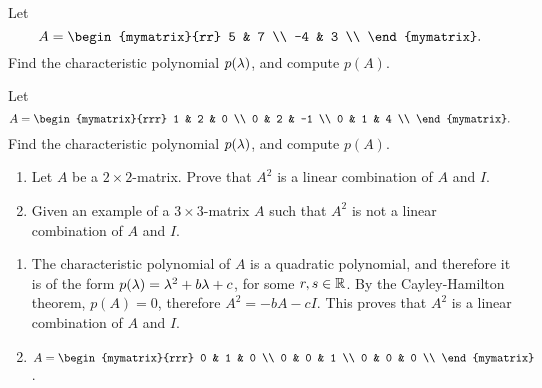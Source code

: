 \begin{enumialphparenastyle}
\begin{ex}
  Let
  \begin{equation*}
    A = \begin{mymatrix}{rr}
      5 & 7 \\
      -4 & 3 \\
    \end{mymatrix}.
  \end{equation*}
  Find the characteristic polynomial $p(\lambda)$, and compute
  $p(A)$.
\end{ex}

\begin{ex}
  Let
  \begin{equation*}
    A = \begin{mymatrix}{rrr}
      1 & 2 & 0 \\
      0 & 2 & -1 \\
      0 & 1 & 4 \\
    \end{mymatrix}.
  \end{equation*}
  Find the characteristic polynomial $p(\lambda)$, and compute
  $p(A)$.
\end{ex}

\begin{ex}
  \begin{enumerate}
  \item Let $A$ be a $2\times 2$-matrix. Prove that $A^2$ is a linear
    combination of $A$ and $I$.
  \item Given an example of a $3\times 3$-matrix $A$ such that $A^2$
    is not a linear combination of $A$ and $I$.
  \end{enumerate}
  \begin{sol}
    \begin{enumerate}
    \item The characteristic polynomial of $A$ is a quadratic
      polynomial, and therefore it is of the form
      $p(\lambda) = \lambda^2 + b\lambda + c$, for some
      $r,s\in\mathbb{R}$. By the Cayley-Hamilton theorem, $p(A)=0$, therefore
      $A^2 = -bA - cI$. This proves that $A^2$ is a linear combination
      of $A$ and $I$.
    \item $A=\begin{mymatrix}{rrr}
        0 & 1 & 0 \\
        0 & 0 & 1 \\
        0 & 0 & 0 \\
      \end{mymatrix}$.
    \end{enumerate}
  \end{sol}
\end{ex}

\end{enumialphparenastyle}
